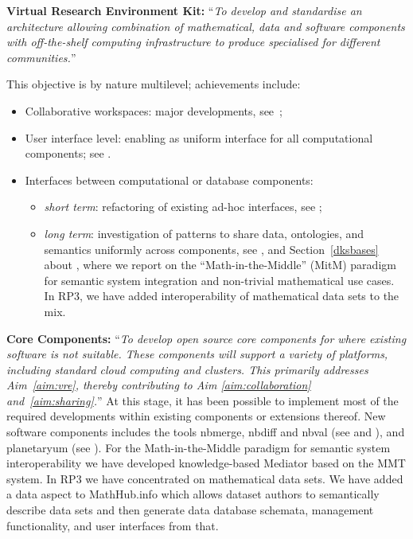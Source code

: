\begin{compactenum}[\bf {Obj} 1\rm]
\item\label{objective:framework} \textbf{Virtual Research Environment Kit:} ``\emph{To develop and standardise an architecture
    allowing combination of mathematical, data and software components with off-the-shelf
    computing infrastructure to produce specialised \VREs for different communities.}''

  This objective is by nature multilevel; achievements include:
  \begin{itemize}
  \item Collaborative workspaces: major \JupyterHub developments,
    see~;
  \item User interface level: enabling \Jupyter as uniform interface for all computational
    components; see .
  \item Interfaces between computational or database components:
    \begin{itemize}
    \item \emph{short term}: refactoring of existing ad-hoc interfaces, see ;
    \item \emph{long term}: investigation of patterns to share data, ontologies, and semantics uniformly across components, see , and Section~\ref{dksbases} about , where we report on the ``Math-in-the-Middle'' (MitM) paradigm for semantic system integration and non-trivial mathematical use cases. In RP3, we have added interoperability of mathematical data sets to the mix.
  \end{itemize}
\end{itemize}

\item\label{objectives:core} \textbf{Core Components:}
  ``\emph{To develop open source core components
  for \VREs where existing software is not suitable. These components
  will support a variety of platforms, including standard cloud
  computing and clusters. This primarily addresses Aim~\ref{aim:vre},
  thereby contributing to Aim \ref{aim:collaboration}
  and~\ref{aim:sharing}.}''
  At this stage, it has been possible to implement most of the required developments within
  existing components or extensions thereof. New software components includes the tools
  nbmerge, nbdiff and nbval (see  and
  ), and planetaryum (see ). For the
  Math-in-the-Middle paradigm for semantic system interoperability we have developed
  knowledge-based Mediator based on the MMT system.
  In RP3 we have concentrated on mathematical data sets. We have added a data aspect to \textsf{MathHub.info} which allows dataset authors to semantically  describe data sets and then generate data database schemata, management functionality, and user interfaces from that.


\end{compactenum}
